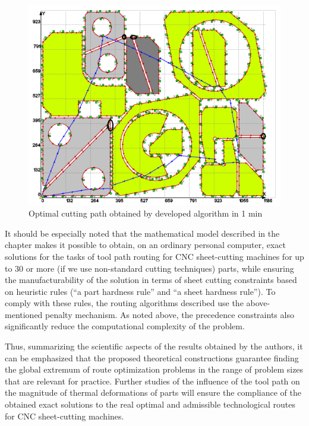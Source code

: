 \begin{figure}
  \centering
  \includegraphics[width=120mm]{Fig4-20.png}
  \caption{Optimal cutting path obtained by developed algorithm in 1 min}
  \label{fig:4}
\end{figure}


It should be especially noted
that the mathematical model described in the chapter
makes it possible to obtain,
on an ordinary personal computer,
exact solutions for the tasks of tool path routing for CNC sheet-cutting machines for up to 30 or more (if we use non-standard cutting techniques) parts, while ensuring the manufacturability of the solution in terms of sheet cutting constraints based on heuristic rules (``a part hardness rule'' and ``a sheet hardness rule''). To comply with these rules, the routing algorithms described use the above-mentioned penalty mechanism. As noted above, the precedence constraints also significantly reduce the computational complexity of the problem.

Thus, summarizing the scientific aspects of the results obtained by the authors,
it can be emphasized that the proposed
theoretical constructions guarantee finding the global extremum of route optimization problems
in the range of problem sizes that are relevant for practice.
Further studies of the influence of the tool path on
the magnitude of thermal deformations of parts will ensure the compliance of the obtained exact solutions
to the real optimal and admissible technological routes for CNC sheet-cutting machines.

